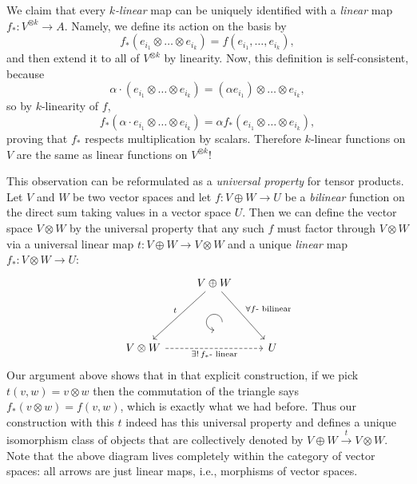 \begin{example}
We claim that every \emph{$k$-linear} map can be uniquely identified
with a \emph{linear} map $f_{\ast}:V^{\otimes k}\to A$. Namely,
we define its action on the basis by
\begin{equation}
f_{\ast}\left(e_{i_{1}}\otimes\ldots\otimes e_{i_{k}}\right)=f\left(e_{i_{1}},\ldots,e_{i_{k}}\right),
\end{equation}
and then extend it to all of $V^{\otimes k}$ by linearity. Now, this
definition is self-consistent, because
\begin{equation}
\alpha\cdot\left(e_{i_{1}}\otimes\ldots\otimes e_{i_{k}}\right)=\left(\alpha e_{i_{1}}\right)\otimes\ldots\otimes e_{i_{k}},
\end{equation}
so by $k$-linearity of $f$, 
\[
f_{\ast}\left(\alpha\cdot e_{i_{1}}\otimes\ldots\otimes e_{i_{k}}\right)=\alpha f_{\ast}\left(e_{i_{1}}\otimes\ldots\otimes e_{i_{k}}\right),
\]
proving that $f_{\ast}$ respects multiplication by scalars. Therefore
$k$-linear functions on $V$ are the same as linear functions on
$V^{\otimes k}$! 

This observation can be reformulated as a \emph{universal property} for tensor products. Let $V$ and $W$ be two vector spaces and let $f:V\oplus W\to U$ be a \emph{bilinear} function on the direct sum taking values in a vector space $U$. Then we can define the vector space $V\otimes W$ by the universal property that any such $f$ must factor through $V\otimes W$ via a universal linear map $t:V\oplus W\to V\otimes W$ and a unique \emph{linear} map $f_\ast:V\otimes W\to U$:
\[\begin{tikzcd}[every matrix/.append style={name=m},   
execute at end picture={\draw [<-] ([xshift=0mm,yshift=-6mm]m-2-2.north) arc[start angle=-90,delta angle=-270,radius=0.25cm];}]
   & V\oplus W\arrow[ddl,swap,"t" ]\arrow[ddr,"\forall f\text{- bilinear}"] & \\
   & \, & \\
   V\otimes W \arrow[rr,dashed,swap,"\exists!\,f_\ast\text{- linear}"]& & U
\end{tikzcd}\]
Our argument above shows that in that explicit construction, if we pick $t(v,w)=v\otimes w$ then the commutation of the triangle says $f_\ast (v\otimes w)=f(v,w)$, which is exactly what we had before. Thus our construction with this $t$ indeed has this universal property and defines a unique isomorphism class of objects that are collectively denoted by  $V\oplus W\overset{t}{\to}V\otimes W $. Note that the above diagram lives completely within the category of vector spaces: all arrows are just linear maps, i.e., morphisms of vector spaces.


\end{example}
